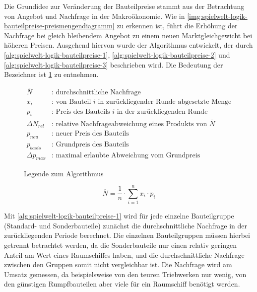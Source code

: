 Die Grundidee zur Veränderung der Bauteilpreise stammt aus der Betrachtung von Angebot und Nachfrage
in der Makroökonomie. Wie in
\ref{img:spielwelt-logik-bauteilpreise-preismengendiagramm}
zu erkennen ist, führt die Erhöhung der Nachfrage bei gleich bleibendem Angebot zu einem neuen
Marktgleichgewicht bei höheren Preisen. Ausgehend hiervon wurde der Algorithmus entwickelt, der
durch \ref{alg:spielwelt-logik-bauteilpreise-1}, \ref{alg:spielwelt-logik-bauteilpreise-2} und
\ref{alg:spielwelt-logik-bauteilpreise-3}
beschrieben wird. Die Bedeutung der Bezeichner ist \ref{alg:spielwelt-logik-bauteilpreise-legende}
zu entnehmen.

\newcommand{\pd}{\Delta{}p_{max}}
\begin{figure}[ht]
     \begin{align}
          \overline{N} &\text{: durchschnittliche Nachfrage}\nonumber \\
          x_i &\text{: von Bauteil $i$ in zurückliegender Runde abgesetzte Menge}\nonumber \\
          p_i &\text{: Preis des Bauteils $i$ in der zurückliegenden Runde}\nonumber \\
          \Delta{}N_{rel} &\text{: relative Nachfrageabweichung eines Produkts von $\overline{N}$}\nonumber \\
          p_{neu} &\text{: neuer Preis des Bauteils}\nonumber \\
          p_{basis} &\text{: Grundpreis des Bauteils}\nonumber \\
          \Delta{}p_{max} &\text{: maximal erlaubte Abweichung vom Grundpreis}\nonumber
     \end{align}
     \caption{Legende zum Algorithmus}
     \label{alg:spielwelt-logik-bauteilpreise-legende}
\end{figure}

\begin{equation}
     \overline{N} = \frac{1}{n} \cdot \sum\limits_{i=1}^n {x_i \cdot p_i}
     \label{alg:spielwelt-logik-bauteilpreise-1}
\end{equation}

Mit \ref{alg:spielwelt-logik-bauteilpreise-1} wird für jede einzelne Bauteilgruppe (Standard- und
Sonderbauteile) zunächst die durchschnittliche Nachfrage in der zurückliegenden Periode berechnet.
Die einzelnen Bauteilgruppen müssen hierbei getrennt betrachtet werden, da die Sonderbauteile nur
einen relativ geringen Anteil am Wert eines Raumschiffes haben, und die durchschnittliche Nachfrage
zwischen den Gruppen somit nicht vergleichbar ist. Die Nachfrage wird am Umsatz gemessen, da
beispielsweise von den teuren Triebwerken nur wenig, von den günstigen Rumpfbauteilen aber viele für
ein Raumschiff benötigt werden.


